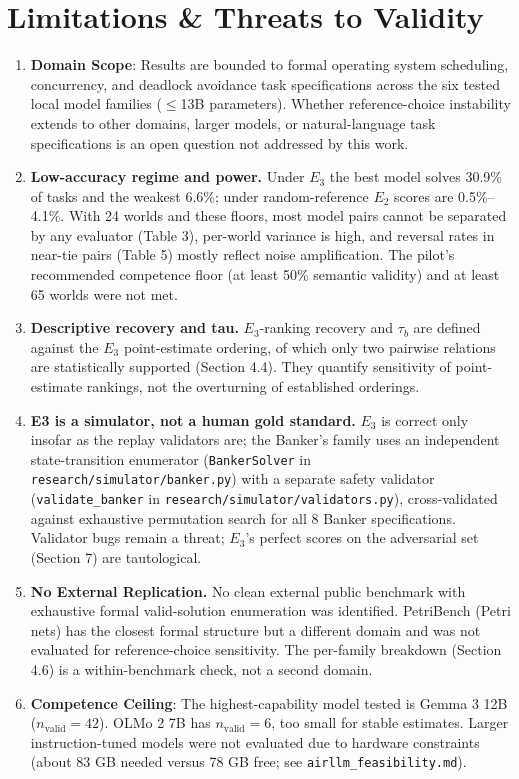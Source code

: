\documentclass[11pt]{article}
\begin{document}
\section{Limitations \& Threats to Validity}
\begin{enumerate}
\item \textbf{Domain Scope}: Results are bounded to formal operating system scheduling, concurrency, and deadlock avoidance task specifications across the six tested local model families ($\le$13B parameters). Whether reference-choice instability extends to other domains, larger models, or natural-language task specifications is an open question not addressed by this work.
\item \textbf{Low-accuracy regime and power.} Under $E_3$ the best model solves 30.9\% of tasks and the weakest 6.6\%; under random-reference $E_2$ scores are 0.5\%--4.1\%. With 24 worlds and these floors, most model pairs cannot be separated by any evaluator (Table 3), per-world variance is high, and reversal rates in near-tie pairs (Table 5) mostly reflect noise amplification. The pilot's recommended competence floor (at least 50\% semantic validity) and at least 65 worlds were not met.
\item \textbf{Descriptive recovery and tau.} $E_3$-ranking recovery and $\tau_b$ are defined against the $E_3$ point-estimate ordering, of which only two pairwise relations are statistically supported (Section 4.4). They quantify sensitivity of point-estimate rankings, not the overturning of established orderings.
\item \textbf{E3 is a simulator, not a human gold standard.} $E_3$ is correct only insofar as the replay validators are; the Banker's family uses an independent state-transition enumerator (\texttt{BankerSolver} in \texttt{research/simulator/banker.py}) with a separate safety validator (\texttt{validate\_banker} in \texttt{research/simulator/validators.py}), cross-validated against exhaustive permutation search for all 8 Banker specifications. Validator bugs remain a threat; $E_3$'s perfect scores on the adversarial set (Section 7) are tautological.
\item \textbf{No External Replication.} No clean external public benchmark with exhaustive formal valid-solution enumeration was identified. PetriBench (Petri nets) has the closest formal structure but a different domain and was not evaluated for reference-choice sensitivity. The per-family breakdown (Section 4.6) is a within-benchmark check, not a second domain.
\item \textbf{Competence Ceiling}: The highest-capability model tested is Gemma 3 12B ($n_{\text{valid}}=42$). OLMo 2 7B has $n_{\text{valid}}=6$, too small for stable estimates. Larger instruction-tuned models were not evaluated due to hardware constraints (about 83 GB needed versus 78 GB free; see \texttt{airllm\_feasibility.md}).

\end{enumerate}
\end{document}
